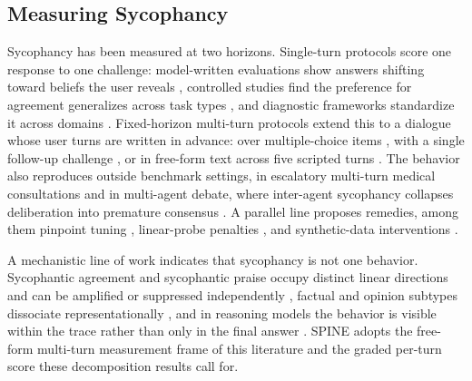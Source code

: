 \subsection{Measuring Sycophancy}
\label{sec:rw-sycophancy}

Sycophancy has been measured at two horizons. Single-turn protocols
score one response to one challenge: model-written evaluations show
answers shifting toward beliefs the user reveals
\citep{perez2022discovering}, controlled studies find the preference for
agreement generalizes across task types \citep{sharma2023sycophancy},
and diagnostic frameworks standardize it across domains
\citep{fanous2025syceval}. Fixed-horizon
multi-turn protocols extend this to a dialogue whose user turns are
written in advance: over multiple-choice items
\citep{liu2025truthdecay}, with a single follow-up challenge
\citep{laban2024flipflop}, or in free-form text across five scripted
turns \citep{SYCON}.
The behavior also reproduces outside benchmark
settings, in escalatory multi-turn medical consultations
\citep{kim2026doctor} and in multi-agent debate, where inter-agent
sycophancy collapses deliberation into premature consensus
\citep{yao2025peacemaker}.
A parallel line proposes remedies, among them
pinpoint tuning \citep{chen2024yesmen}, linear-probe penalties
\citep{papadatos2024probe}, and synthetic-data interventions
\citep{wei2023synthetic}.

A mechanistic line of work indicates that sycophancy is not one
behavior. Sycophantic agreement and sycophantic praise occupy distinct
linear directions and can be amplified or suppressed independently
\citep{vennemeyer2025sycophancy}, factual and opinion subtypes
dissociate representationally \citep{baez2026dissociating}, and in
reasoning models the behavior is visible within the trace rather than
only in the final answer \citep{monica2026anonymous}. SPINE adopts the
free-form multi-turn measurement frame of this literature and the
graded per-turn score these decomposition results call for.


